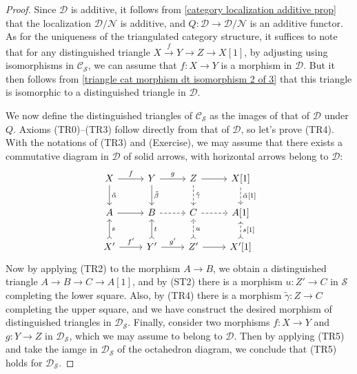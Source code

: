 \begin{proof}
Since $\mathcal{D}$ is additive, it follows from \cref{category localization additive prop} that the localization $\mathcal{D}/\mathcal{N}$ is additive, and $Q:\mathcal{D}\to\mathcal{D}/\mathcal{N}$ is an additive functor. As for the uniqueness of the triangulated category structure, it suffices to note that for any distinguished triangle $X\stackrel{f}{\to} Y\to Z\to X[1]$, by adjusting using isomorphisms in $\mathcal{C}_\mathcal{S}$, we can assume that $f:X\to Y$ is a morphism in $\mathcal{D}$. But it then follows from \cref{triangle cat morphism dt isomorphism 2 of 3} that this triangle is isomorphic to a distinguished triangle in $\mathcal{D}$.\par
We now define the distinguished triangles of $\mathcal{C}_\mathcal{S}$ as the images of that of $\mathcal{D}$ under $Q$. Axioms (TR0)--(TR3) follow directly from that of $\mathcal{D}$, so let's prove (TR4). With the notations of (TR3) and (Exercise), we may assume that there exists a commutative diagram in $\mathcal{D}$ of solid arrows, with horizontal arrows belong to $\mathcal{D}$:
\[\begin{tikzcd}
X\ar[r,"f"]\ar[d,"\tilde{\alpha}"]&Y\ar[r,"g"]\ar[d,"\tilde{\beta}"]&Z\ar[r]\ar[d,dashed,"\tilde{\gamma}"]&X[1]\ar[d,dashed,"{\tilde{\alpha}[1]}"]\\
A\ar[r]&B\ar[r,dashed]&C\ar[r,dashed]&A[1]\\
X'\ar[r,"f'"]\ar[u,swap,"s",tail]&Y'\ar[r,"g'"]\ar[u,swap,"t",tail]&Z'\ar[r]\ar[u,dashed,swap,"u",tail]&X'[1]\ar[u,dashed,swap,"{s[1]}",tail]
\end{tikzcd}\]
Now by applying (TR2) to the morphism $A\to B$, we obtain a distinguished triangle $A\to B\to C\to A[1]$, and by (ST2) there is a morphism $u:Z'\to C$ in $\mathcal{S}$ completing the lower square. Also, by (TR4) there is a morphism $\tilde{\gamma}:Z\to C$ completing the upper square, and we have construct the desired morphism of distinguished triangles in $\mathcal{D}_\mathcal{S}$. Finally, consider two morphisms $f:X\to Y$ and $g:Y\to Z$ in $\mathcal{D}_\mathcal{S}$, which we may assume to belong to $\mathcal{D}$. Then by applying (TR5) and take the iamge in $\mathcal{D}_\mathcal{S}$ of the octahedron diagram, we conclude that (TR5) holds for $\mathcal{D}_\mathcal{S}$.
\end{proof}

